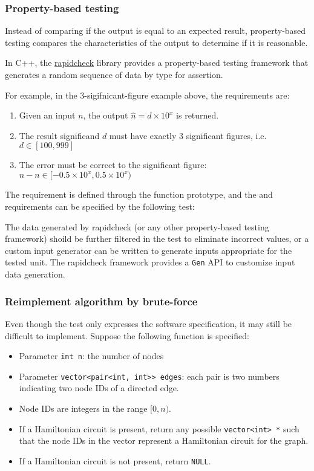 \subsubsection{Property-based testing}
Instead of comparing if the output is equal to an expected result,
property-based testing compares the characteristics of the output to determine if it is reasonable.

In C++, the \href{https://github.com/emil-e/rapidcheck}{rapidcheck} library
provides a property-based testing framework that generates a random sequence of data by type for assertion.

For example, in the 3-sigifnicant-figure example above, the requirements are:

\begin{enumerate}
	\item Given an input $n$, the output $\hat{n} = d \times 10^{x}$ is returned.
	\item The result significand $d$ must have exactly 3 significant figures, i.e. $d \in [100, 999]$
	\item The error must be correct to the  significant figure: $\hat{n} - n \in [-0.5 \times 10^{x}, 0.5 \times 10^{x})$
\end{enumerate}

The  requirement is defined through the function prototype,
and the  and  requirements can be specified by the following test:


The data generated by rapidcheck (or any other property-based testing framework) shoild be further filtered
in the test to eliminate incorrect values, or a custom input generator can be written to
generate inputs appropriate for the tested unit.
The rapidcheck framework provides a \texttt{Gen} API to customize input data generation.

\subsubsection{Reimplement algorithm by brute-force}
Even though the test only expresses the software specification, it may still be difficult to implement.
Suppose the following function is specified:

\begin{itemize}
	\item Parameter \texttt{int n}: the number of nodes
	\item Parameter \texttt{vector<pair<int, int>> edges}: each pair is two numbers indicating two node IDs of a directed edge.
	\item Node IDs are integers in the range $[0, n)$.
	\item If a Hamiltonian circuit is present, return any possible \texttt{vector<int> *} such that
		the node IDs in the vector represent a Hamiltonian circuit for the graph.
	\item If a Hamiltonian circuit is not present, return \texttt{NULL}.
\end{itemize}

